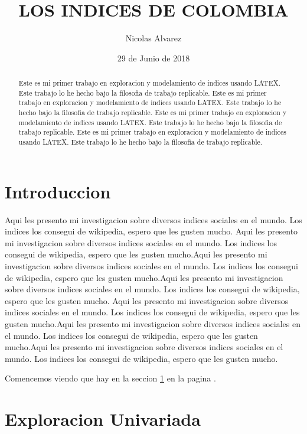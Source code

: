 \documentclass{article}
\title{LOS INDICES DE COLOMBIA}
\author[1]{\normalsize Nicolas Alvarez}
\affil[1]{\small  Universidad de los Andes\\
\texttt{{nd.alvarez11}@uniandes.edu.col}}
\date{29 de Junio de 2018}
\begin{document}


\maketitle

\begin{abstract}
Este es mi primer trabajo en exploracion y modelamiento de indices usando LATEX. Este trabajo lo he hecho bajo la filosofia de trabajo replicable. Este es mi primer trabajo en exploracion y modelamiento de indices usando LATEX. Este trabajo lo he hecho bajo la filosofia de trabajo replicable. Este es mi primer trabajo en exploracion y modelamiento de indices usando LATEX. Este trabajo lo he hecho bajo la filosofia de trabajo replicable. Este es mi primer trabajo en exploracion y modelamiento de indices usando LATEX. Este trabajo lo he hecho bajo la filosofia de trabajo replicable.
\end{abstract}


\section*{Introduccion}

Aqui les presento mi investigacion sobre diversos indices sociales en el mundo. Los indices los consegui de wikipedia, espero que les gusten mucho. Aqui les presento mi investigacion sobre diversos indices sociales en el mundo. Los indices los consegui de wikipedia, espero que les gusten mucho.Aqui les presento mi investigacion sobre diversos indices sociales en el mundo. Los indices los consegui de wikipedia, espero que les gusten mucho.Aqui les presento mi investigacion sobre diversos indices sociales en el mundo. Los indices los consegui de wikipedia, espero que les gusten mucho.
Aqui les presento mi investigacion sobre diversos indices sociales en el mundo. Los indices los consegui de wikipedia, espero que les gusten mucho.Aqui les presento mi investigacion sobre diversos indices sociales en el mundo. Los indices los consegui de wikipedia, espero que les gusten mucho.Aqui les presento mi investigacion sobre diversos indices sociales en el mundo. Los indices los consegui de wikipedia, espero que les gusten mucho.

Comencemos viendo que hay en la seccion \ref{univariada} en la pagina \pageref{univariada}.

\clearpage

\section{Exploracion Univariada}\label{univariada}
\end{document}
